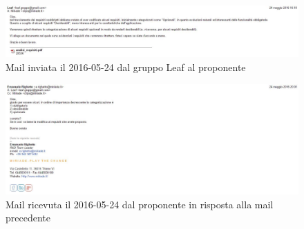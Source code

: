 \documentclass[../RiunioneInterna16-02-25.tex]{subfiles}
\begin{document}
	
	\begin{figure} [h]
		\includegraphics[width=\textwidth]{img/RichiestaMail}
		\caption{Mail inviata il 2016-05-24 dal gruppo Leaf al proponente}		
		\label{fig:RichiestaMail}
	\end{figure}
	\hfill
	\begin{figure}[h]
		\includegraphics[width=\textwidth]{img/RispostaMail}
		\caption{Mail ricevuta il 2016-05-24 dal proponente in risposta alla mail precedente}		
		\label{fig:RispostaMail}
	\end{figure}
\end{document}

